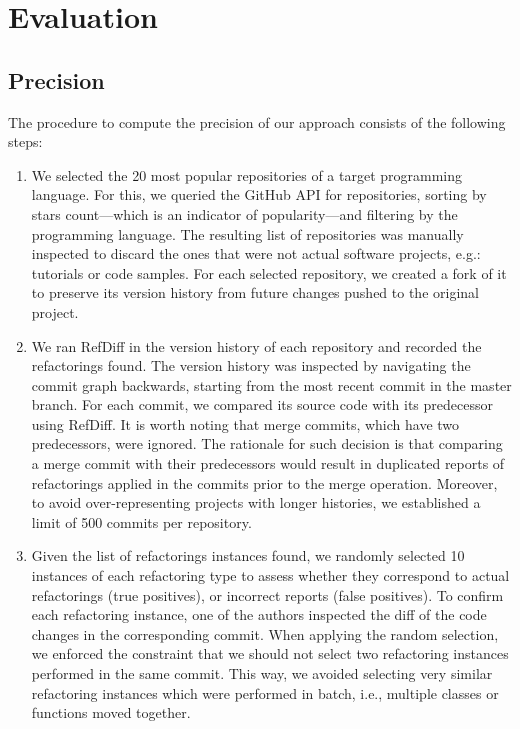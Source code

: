 \section{Evaluation}


\subsection{Precision}
\label{SecPrecisionProcedure}

The procedure to compute the precision of our approach consists of the following steps:

\begin{enumerate}  
\item We selected the 20 most popular repositories of a target programming language. For this, we queried the GitHub API for repositories, sorting by stars count---which is an indicator of popularity---and filtering by the programming language.
The resulting list of repositories was manually inspected to discard the ones that were not actual software projects, e.g.: tutorials or code samples.
For each selected repository, we created a fork of it to preserve its version history from future changes pushed to the original project.

\item We ran RefDiff in the version history of each repository and recorded the refactorings found.
The version history was inspected by navigating the commit graph backwards, starting from the most recent commit in the master branch.
For each commit, we compared its source code with its predecessor using RefDiff.
It is worth noting that merge commits, which have two predecessors, were ignored.
The rationale for such decision is that comparing a merge commit with their predecessors would result in duplicated reports of refactorings applied in the commits prior to the merge operation.
Moreover, to avoid over-representing projects with longer histories, we established a limit of 500 commits per repository.

\item Given the list of refactorings instances found, we randomly selected 10 instances of each refactoring type to assess whether they correspond to actual refactorings (true positives), or incorrect reports (false positives).
To confirm each refactoring instance, one of the authors inspected the diff of the code changes in the corresponding commit.
When applying the random selection, we enforced the constraint that we should not select two refactoring instances performed in the same commit.
This way, we avoided selecting very similar refactoring instances which were performed in batch, i.e., multiple classes or functions moved together.
\end{enumerate}

